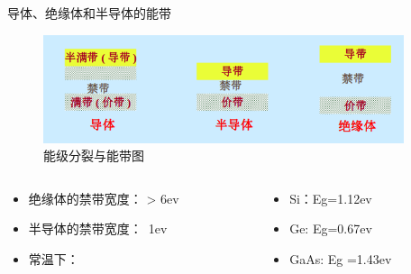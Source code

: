 \documentclass[trans]{beamer} %
\begin{document}
\begin{frame}{导体、绝缘体和半导体的能带}

  \begin{figure}[htbp] 
    \centering\includegraphics[height=1.25in]{source/ch2/fg215.png} 
    \caption{能级分裂与能带图}
    \end{figure} 
     \begin{columns}
        \begin{column}{0.6\textwidth}
        
        \begin{itemize}
        \item 绝缘体的禁带宽度：
	> 6ev
        \item 半导体的禁带宽度：~1ev
        \item        常温下：
        
    \end{itemize}
    
        \end{column}
        \begin{column}{0.4\textwidth}
 
        \begin{itemize}
            \item Si：Eg=1.12ev
            \item Ge: Eg=0.67ev
            \item GaAs:  Eg =1.43ev
        \end{itemize}
        
        \end{column}
        \end{columns}
   
 
 \end{frame}
\end{document}
